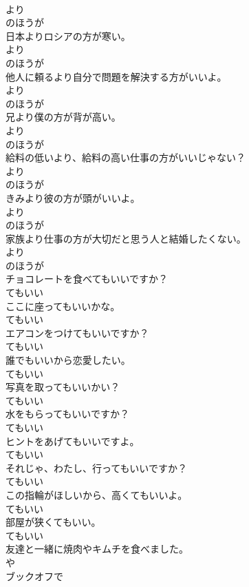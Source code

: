 \documentclass[8pt]{extreport}
\begin{document}
\begin{CJK}{UTF8}{min}
\\	より 
\\	のほうが 
\\	日本よりロシアの方が寒い。	
\\	より 
\\	のほうが 
\\	他人に頼るより自分で問題を解決する方がいいよ。	
\\	より 
\\	のほうが 
\\	兄より僕の方が背が高い。	
\\	より 
\\	のほうが 
\\	給料の低いより、給料の高い仕事の方がいいじゃない？	
\\	より 
\\	のほうが 
\\	きみより彼の方が頭がいいよ。	
\\	より 
\\	のほうが 
\\	家族より仕事の方が大切だと思う人と結婚したくない。	
\\	より 
\\	のほうが 
\\	チョコレートを食べてもいいですか？	
\\	てもいい
\\	ここに座ってもいいかな。	
\\	てもいい
\\	エアコンをつけてもいいですか？	
\\	てもいい
\\	誰でもいいから恋愛したい。	
\\	てもいい
\\	写真を取ってもいいかい？	
\\	てもいい
\\	水をもらってもいいですか？	
\\	てもいい
\\	ヒントをあげてもいいですよ。	
\\	てもいい
\\	それじゃ、わたし、行ってもいいですか？	
\\	てもいい
\\	この指輪がほしいから、高くてもいいよ。	
\\	てもいい
\\	部屋が狭くてもいい。	
\\	てもいい
\\	友達と一緒に焼肉やキムチを食べました。	
\\	や
\\	ブックオフで

\end{CJK}
\end{document}
